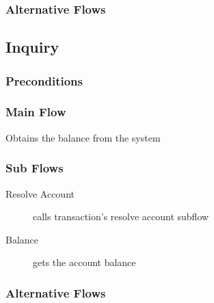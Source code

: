 \documentclass[10pt,letterpaper,notitlepage]{article}
\begin{document}
\subsubsection{Alternative Flows}

\subsection{Inquiry}
\subsubsection{Preconditions}
\subsubsection{Main Flow}
Obtains the balance from the system
\subsubsection{Sub Flows}
\begin{description}
\item[Resolve Account] calls transaction's resolve account subflow
\item[Balance] gets the account balance
\end{description}
\subsubsection{Alternative Flows}
\end{document}
